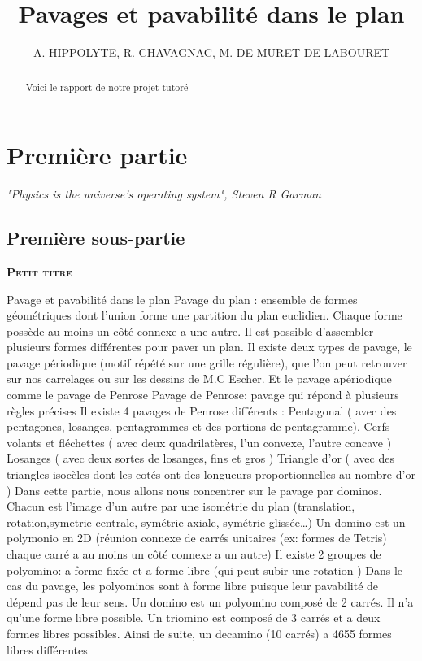 \documentclass{article}
\title{Pavages et pavabilité dans le plan}
\author{A. HIPPOLYTE, R. CHAVAGNAC, M. DE MURET DE LABOURET}
\begin{document}
\maketitle

\begin{abstract}
    Voici le rapport de notre projet tutoré
\end{abstract}

\tableofcontents

\section{Première partie}

\begin{displayquote}
    \emph{"Physics is the universe’s operating system", Steven R Garman}
\end{displayquote}

\subsection{Première sous-partie}

\textbf{\textsc{Petit titre}}

Pavage et pavabilité dans le plan
Pavage du plan : ensemble de formes géométriques dont l’union forme une partition du plan euclidien. Chaque forme possède au moins un côté connexe a une autre.
Il est possible d’assembler plusieurs formes différentes pour paver un plan.
Il existe deux types de pavage, le pavage périodique (motif répété sur une grille régulière), que l’on peut retrouver sur nos carrelages ou sur les dessins de M.C Escher.
Et le pavage apériodique comme le pavage de Penrose
Pavage de Penrose: pavage qui répond à plusieurs règles précises
Il existe 4 pavages de Penrose différents :
Pentagonal ( avec des pentagones, losanges, pentagrammes et des portions de pentagramme).
Cerfs-volants et fléchettes ( avec deux quadrilatères, l'un convexe, l'autre concave )
Losanges ( avec deux sortes de losanges, fins et gros )
Triangle d’or ( avec des triangles isocèles dont les cotés ont des longueurs proportionnelles au nombre d’or )
Dans cette partie, nous allons nous concentrer sur le pavage par dominos.
Chacun est l’image d’un autre par une isométrie du plan (translation, rotation,symetrie centrale, symétrie axiale, symétrie glissée…)
Un domino est un polymonio en 2D (réunion connexe de carrés unitaires (ex: formes de Tetris) chaque carré a au moins un côté connexe a un autre)
Il existe 2 groupes de polyomino: a forme fixée et a forme libre (qui peut subir une rotation )
Dans le cas du pavage, les polyominos sont à forme libre puisque leur pavabilité de dépend pas de leur sens.
Un domino est un polyomino composé de 2 carrés. Il n’a qu’une forme libre possible.
Un triomino est composé de 3 carrés et a deux formes libres possibles.
Ainsi de suite, un decamino (10 carrés) a 4655 formes libres différentes
\end{document}
